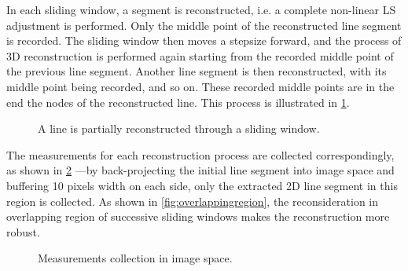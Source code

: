 In each sliding window, a segment is reconstructed, i.e. a complete non-linear LS adjustment is performed. Only the middle point of the reconstructed line segment is recorded. The sliding window then moves a stepsize forward, and the process of 3D reconstruction is performed again starting from the recorded middle point of the previous line segment. Another line segment is then reconstructed, with its middle point being recorded, and so on. These recorded middle points are in the end the nodes of the reconstructed line. This process is illustrated in \cref{fig:slidingwindow}.


\begin{figure}
	\centering
	
	
	
	\caption{\small A line is partially reconstructed through a sliding window.}
	\label{fig:slidingwindow}
\end{figure}


The measurements for each reconstruction process are collected correspondingly, as shown in \cref{fig:measurementscollection} ---by back-projecting the initial line segment into image space and buffering 10 pixels width on each side, only the extracted 2D line segment in this region is collected. %
As shown in \cref{fig:overlappingregion}, the reconsideration in overlapping region of successive sliding windows makes the reconstruction more robust.

\begin{figure}
	\centering
	
	\caption{\small Measurements collection in image space.}
	\label{fig:measurementscollection}
\end{figure}


